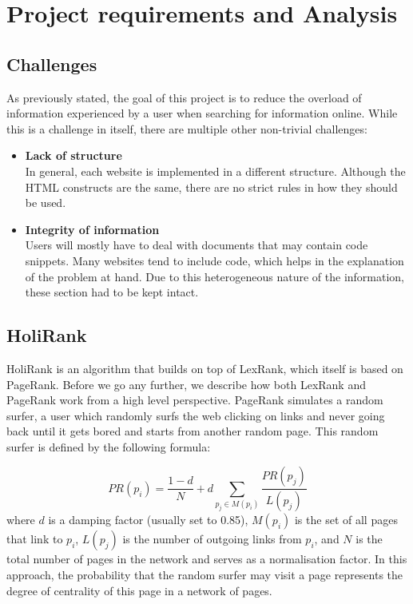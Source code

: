\section{Project requirements and Analysis}\label{sec:requirementsAndAnalysis}


\subsection{Challenges}
As previously stated, the goal of this project is to reduce the overload of information experienced by a user when searching for information online. While this is a challenge in itself, there are multiple other non-trivial challenges:

\begin{itemize}
\item {\bf Lack of structure}\label{sec:lackOfStructure}\\
In general, each website is implemented in a different structure. Although the HTML constructs are the same, there are no strict rules in how they should be used. %
\item {\bf Integrity of information}\\
Users will mostly have to deal with documents that may contain code snippets. Many websites tend to include code, which helps in the explanation of the problem at hand. Due to this heterogeneous nature of the information, these section had to be kept intact.

\end{itemize}

\subsection{HoliRank}

HoliRank\cite{Ponz2017a} is an algorithm that builds on top of LexRank\cite{Erkan:2004:LGL:1622487.1622501}, which itself is based on PageRank\cite{ilprints422}. 
Before we go any further, we describe how both LexRank and PageRank work from a high level perspective. PageRank simulates a random surfer, a user which randomly surfs the web clicking on links and never going back until it gets bored and starts from another random page. This random surfer is defined by the following formula:

\begin{equation}
PR(p_i) = \frac{1-d}{N}+ d\sum\limits_{p_j\in M(p_i)}\frac{PR(p_j)}{L(p_j)}
\end{equation}
where $d$ is a damping factor (usually set to 0.85), $M(p_i)$ is the set of all pages that link to $p_i$, $L(p_j)$ is the number of outgoing links from $p_i$, and $N$ is the total number of pages in the network and serves as a normalisation factor. In this approach, the probability that the random surfer may visit a page represents the degree of centrality of this page in a network of pages.

